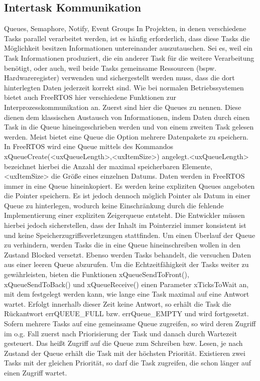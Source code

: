 \subsection{Intertask Kommunikation}
Queues, Semaphore, Notify, Event Groups
In Projekten, in denen verschiedene Tasks parallel verarbeitet werden, ist es häufig erforderlich, dass diese Tasks die Möglichkeit besitzen Informationen untereinander auszutauschen. Sei es, weil ein Task Informationen produziert, die ein anderer Task für die weitere Verarbeitung benötigt, oder auch, weil beide Tasks gemeinsame Ressourcen (bspw. Hardwareregister) verwenden und sichergestellt werden muss, dass die dort hinterlegten Daten jederzeit korrekt sind. Wie bei normalen Betriebssystemen bietet auch FreeRTOS hier verschiedene Funktionen zur Interprozesskommunikation an. Zuerst sind hier die Queues zu nennen. Diese dienen dem klassischen Austausch von Informationen, indem Daten durch einen Task in die Queue hineingeschrieben werden und von einem zweiten Task gelesen werden. Meist bietet eine Queue die Option mehrere Datenpakete zu speichern. In FreeRTOS wird eine Queue mittels des Kommandos xQueueCreate(<uxQueueLength>,<uxItemSize>) angelegt.<uxQueueLength> bezeichnet hierbei die Anzahl der maximal speicherbaren Elemente, <uxItemSize> die Größe eines einzelnen Datums. Daten werden in FreeRTOS immer in eine Queue hineinkopiert. 
Es werden keine expliziten Queues angeboten die Pointer speichern. Es ist jedoch dennoch möglich Pointer als Datum in einer Queue zu hinterlegen, wodurch keine Einschränkung durch die fehlende Implementierung einer expliziten Zeigerqueue entsteht. Die Entwickler müssen hierbei jedoch sicherstellen, dass der Inhalt im Pointerziel immer konsistent ist und keine Speicherzugriffsverletzungen stattfinden.
Um einen Überlauf der Queue zu verhindern, werden Tasks die in eine Queue hineinschreiben wollen in den Zustand Blocked versetzt. Ebenso werden Tasks behandelt, die versuchen Daten aus einer leeren Queue abzurufen. Um die Echtzeitfähigkeit der Tasks weiter zu gewährleisten, bieten die Funktionen xQueueSendToFront(), xQueueSendToBack() und xQueueReceive() einen Parameter xTicksToWait an, mit dem festgelegt werden kann, wie lange eine Task maximal auf eine Antwort wartet. Erfolgt innerhalb dieser Zeit keine Antwort, so erhält die Task die Rückantwort errQUEUE\_FULL bzw. errQueue\_EMPTY und wird fortgesetzt. 
Sofern mehrere Tasks auf eine gemeinsame Queue zugreifen, so wird deren Zugriff im o.g. Fall zuerst nach Priorisierung der Task und danach durch Wartezeit gesteuert. Das heißt Zugriff auf die Queue zum Schreiben bzw. Lesen, je nach Zustand der Queue erhält die Task mit der höchsten Priorität. Existieren zwei Tasks mit der gleichen Priorität, so darf die Task zugreifen, die schon länger auf einen Zugriff wartet.
